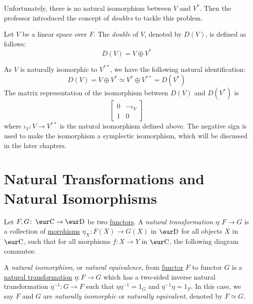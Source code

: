 Unfortunately, there is no natural isomorphism between $V$ and $V^*$. Then the professor introduced the concept of \emph{doubles} to tackle this problem.
\begin{definition}[Double]\label{def:double}
  Let $V$ be a linear space over $F$. The \emph{double} of $V$, denoted by $D(V)$, is defined as follows:
  \[ D(V) = V \oplus V^* \]
\end{definition}

As $V$ is naturally isomorphic to $V^{**}$, we have the following natural identification:
\[
  D(V) = V \oplus V^* \simeq V^* \oplus V^{**} = D(V^*)
\]
The matrix representation of the isomorphism between $D(V)$ and $D(V^*)$ is
\[
  \begin{bmatrix}
    0 & -\iota_V \\
    1 & 0
  \end{bmatrix}
\]
where $\iota_V \colon V \to V^{**}$ is the natural isomorphism defined above. The negative sign is used to make the isomorphism a symplectic isomorphism, which will be discussed in the later chapters.

\section{Natural Transformations and Natural Isomorphisms}

\begin{definition}\label{def:natural_transformation}
  Let $F, G \colon \Ca \to \D$ be two \hyperref[def:functor]{functors}. A \emph{natural transformation} $\eta \colon F \to G$ is a collection of \hyperref[def:morphism]{morphisms} $\eta_X \colon F(X) \to G(X)$ in $\D$ for all objects $X$ in $\Ca$, such that for all morphisms $f \colon X \to Y$ in $\Ca$, the following diagram commutes:
  \begin{center}
  \end{center}
\end{definition}

\begin{definition}\label{def:natural_isomorphism}
  A \emph{natural isomorphism}, or \emph{natural equivalence}, from \hyperref[def:functor]{functor} $F$ to functor $G$ is a \hyperref[def:natural_transformation]{natural transformation} $\eta \colon F \to G$ which has a two-sided inverse natural transformation $\eta^{-1} \colon G \to F$ such that $\eta \eta^{-1} = 1_G$ and $\eta^{-1} \eta = 1_F$. In this case, we say $F$ and $G$ are \emph{naturally isomorphic} or \emph{naturally equivalent}, denoted by $F \simeq G$.
\end{definition}

